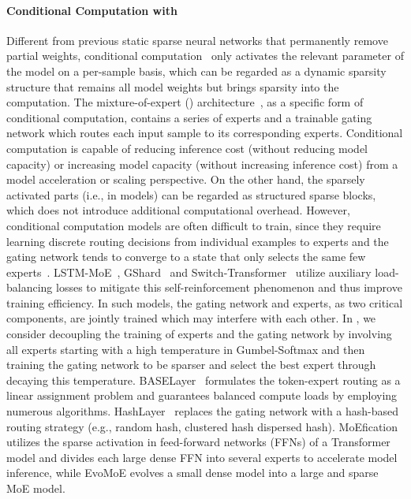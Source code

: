 \paragraph{Conditional Computation with \moe{}}
Different from previous static sparse neural networks that permanently remove partial weights, conditional computation~\cite{DBLP:journals/corr/BengioLC13} only activates the relevant parameter of the model on a per-sample basis, which can be regarded as a dynamic sparsity structure that remains all model weights but brings sparsity into the computation. %
The mixture-of-expert (\moe{}) architecture~\cite{DBLP:lstm_moe}, as a specific form of conditional computation, contains a series of experts and a trainable gating network which routes each input sample to its corresponding experts.
Conditional computation is capable of reducing inference cost (without reducing model capacity) or increasing model capacity (without increasing inference cost) from a model acceleration or scaling perspective.
On the other hand, the sparsely activated parts (i.e., \moe{} in models) can be regarded as structured sparse blocks, which does not introduce additional computational overhead.
However, conditional computation models are often difficult to train, since they require learning discrete routing decisions from individual examples to experts and the gating network tends to converge to a state that only selects the same few experts~\cite{eigen2013learning}.
LSTM-MoE~\cite{DBLP:lstm_moe}, GShard~\cite{DBLP:gshard} and Switch-Transformer~\cite{DBLP:switch} utilize auxiliary load-balancing losses to mitigate this self-reinforcement phenomenon and thus improve training efficiency.
In such \moe{} models, the gating network and experts, as two critical components,
are jointly trained which may interfere with each other. 
In \evomoe, we consider decoupling the training of experts and the gating network by involving all experts starting with a high temperature in Gumbel-Softmax and then training the gating network to be sparser and select the best expert through decaying this temperature. 
BASELayer~\cite{lewis2021base} formulates the token-expert routing as a linear assignment problem and guarantees balanced compute loads by employing numerous algorithms. 
HashLayer~\cite{roller2021hash} replaces the gating network with a hash-based routing strategy (e.g., random hash, clustered hash dispersed hash).
MoEfication~\cite{zhang2021moefication} utilizes the sparse activation in feed-forward networks (FFNs) of a Transformer model and divides each large dense FFN into several experts to accelerate model inference, while EvoMoE evolves a small dense model into a large and sparse MoE model.

